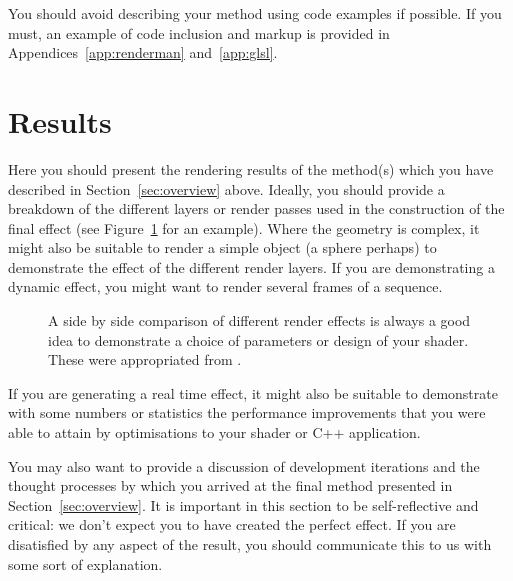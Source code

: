 \documentclass[]{acmsiggraph}
\begin{document}
You should avoid describing your method using code examples if possible. If you must, an example of code inclusion and markup is provided in Appendices~\ref{app:renderman} and~\ref{app:glsl}.

\section{Results} \label{sec:results}
Here you should present the rendering results of the method(s) which you have described in Section~\ref{sec:overview} above. Ideally, you should provide a breakdown of the different layers or render passes used in the construction of the final effect (see Figure~\ref{fig:comparison} for an example). Where the geometry is complex, it might also be suitable to render a simple object (a sphere perhaps) to demonstrate the effect of the different render layers. If you are demonstrating a dynamic effect, you might want to render several frames of a sequence.

\begin{figure}[htbp]
  \centering
 \hfill
 \caption{\label{fig:comparison}A side by side comparison of different render effects is always a good idea to demonstrate a choice of parameters or design of your shader. These were appropriated from \protect\cite{renderman16}.}
\end{figure}

If you are generating a real time effect, it might also be suitable to demonstrate with some numbers or statistics the performance improvements that you were able to attain by optimisations to your shader or C++ application. 

You may also want to provide a discussion of development iterations and the thought processes by which you arrived at the final method presented in Section~\ref{sec:overview}. It is important in this section to be self-reflective and critical: we don't expect you to have created the perfect effect. If you are disatisfied by any aspect of the result, you should communicate this to us with some sort of explanation.




\newpage
\appendix
\end{document}
